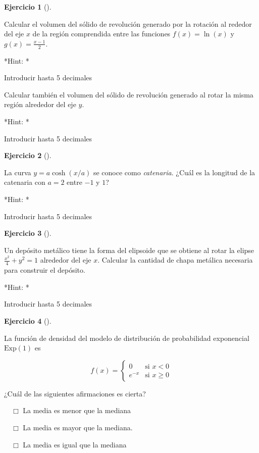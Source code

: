 \documentclass[
  a4paper,
]{scrreport}
\theoremstyle{definition}
\newtheorem{exercise}{Ejercicio}[chapter]
\theoremstyle{remark}
\begin{document}
\begin{exercise}[]\protect\hypertarget{exr-integrales-propuesto-5}{}\label{exr-integrales-propuesto-5}

Calcular el volumen del sólido de revolución generado por la rotación al
rededor del eje \(x\) de la región comprendida entre las funciones
\(f(x)=\ln(x)\) y \(g(x)=\frac{x-1}{2}\).

\vspace{18pt}*Hint: *

Introducir hasta 5 decimales

Calcular también el volumen del sólido de revolución generado al rotar
la misma región alrededor del eje \(y\).

\vspace{18pt}*Hint: *

Introducir hasta 5 decimales

\end{exercise}

\begin{exercise}[]\protect\hypertarget{exr-integrales-propuesto-6}{}\label{exr-integrales-propuesto-6}

La curva \(y=a\cosh(x/a)\) se conoce como \emph{catenaria}. ¿Cuál es la
longitud de la catenaria con \(a=2\) entre \(-1\) y \(1\)?

\vspace{18pt}*Hint: *

Introducir hasta 5 decimales

\end{exercise}

\begin{exercise}[]\protect\hypertarget{exr-integrales-propuesto-7}{}\label{exr-integrales-propuesto-7}

Un depósito metálico tiene la forma del elipsoide que se obtiene al
rotar la elipse \(\frac{x^2}{4}+y^2=1\) alrededor del eje \(x\).
Calcular la cantidad de chapa metálica necesaria para construir el
depósito.

\vspace{18pt}*Hint: *

Introducir hasta 5 decimales

\end{exercise}

\begin{exercise}[]\protect\hypertarget{exr-integrales-propuesto-8}{}\label{exr-integrales-propuesto-8}

La función de densidad del modelo de distribución de probabilidad
exponencial \(\mbox{Exp}(1)\) es

\[
f(x)=
\begin{cases}
0 & \mbox{si $x<0$}\\
e^{-x} & \mbox{si $x\geq 0$}
\end{cases}
\]

¿Cuál de las siguientes afirmaciones es cierta?

${\quad\Box}$ La media es menor que la mediana

${\quad\Box}$ La media es mayor que la mediana.

${\quad\Box}$ La media es igual que la mediana

\end{exercise}
\end{document}
